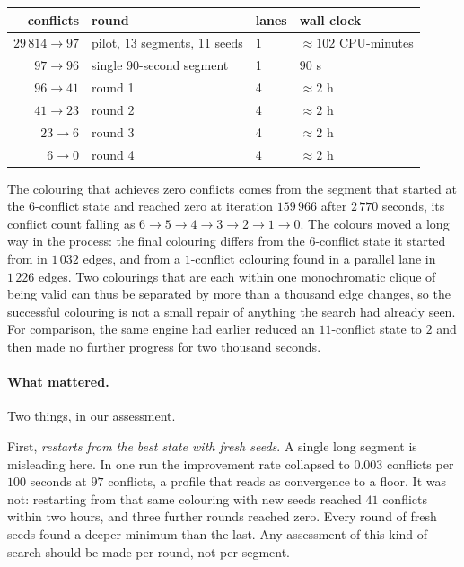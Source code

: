 \documentclass[11pt]{article}
\begin{document}
\begin{center}
\begin{tabular}{@{}rlll@{}}
\toprule
conflicts & round & lanes & wall clock\\
\midrule
$29\,814 \to 97$ & pilot, 13 segments, 11 seeds & 1 & $\approx 102$ CPU-minutes\\
$97 \to 96$ & single 90-second segment & 1 & $90$ s\\
$96 \to 41$ & round 1 & 4 & $\approx 2$ h\\
$41 \to 23$ & round 2 & 4 & $\approx 2$ h\\
$23 \to 6$ & round 3 & 4 & $\approx 2$ h\\
$6 \to 0$ & round 4 & 4 & $\approx 2$ h\\
\bottomrule
\end{tabular}
\end{center}

The colouring that achieves zero conflicts comes from the segment that started at the $6$-conflict
state and reached zero at iteration $159\,966$ after $2\,770$ seconds, its conflict count falling as
$6\to5\to4\to3\to2\to1\to0$. The colours moved a long way in the process: the final colouring
differs from the $6$-conflict state it started from in $1\,032$ edges, and from a $1$-conflict
colouring found in a parallel lane in $1\,226$ edges. Two colourings that are each within one
monochromatic clique of being valid can thus be separated by more than a thousand edge changes, so
the successful colouring is not a small repair of anything the search had already seen. For
comparison, the same engine had earlier reduced an $11$-conflict state to $2$ and then made no further
progress for two thousand seconds.

\paragraph{What mattered.}
Two things, in our assessment.

First, \emph{restarts from the best state with fresh seeds}. A single long segment is misleading here.
In one run the improvement rate collapsed to $0.003$ conflicts per $100$ seconds at $97$ conflicts, a
profile that reads as convergence to a floor. It was not: restarting from that same colouring with new
seeds reached $41$ conflicts within two hours, and three further rounds reached zero. Every round of
fresh seeds found a deeper minimum than the last. Any assessment of this kind of search should be made
per round, not per segment.
\end{document}
